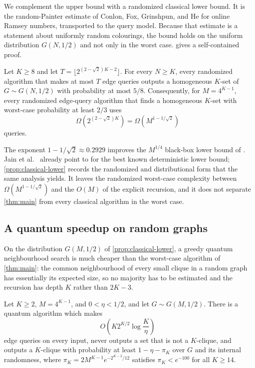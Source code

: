 We complement the upper bound with a randomized classical lower bound.  It
is the random-Painter estimate of Conlon, Fox, Grinshpun, and He
\cite[proof of Theorem~1]{ConlonFoxGrinshpunHe2019} for online Ramsey
numbers,
transported to the query model.  Because that estimate is a statement about
uniformly random colourings, the bound holds on the uniform distribution
$G(N,1/2)$ and not only in the worst case.  
gives a self-contained proof.

\begin{proposition}
\label{prop:classical-lower}
Let $K\ge8$ and let $T=\lfloor2^{(2-\sqrt2)K-2}\rfloor$.  For every
$N\ge K$, every randomized algorithm that makes at most $T$ edge queries
outputs a homogeneous $K$-set of $G\sim G(N,1/2)$ with probability at most
$5/8$.
Consequently, for $M=4^{K-1}$, every randomized edge-query algorithm that
finds a homogeneous $K$-set with worst-case probability at least $2/3$ uses
\[
 \Omega\!\left(2^{(2-\sqrt2)K}\right)
 =\Omega\!\left(M^{1-1/\sqrt2}\right)
\]
queries.
\end{proposition}

The exponent $1-1/\sqrt2\approx0.2929$ improves the $M^{1/4}$ black-box
lower bound of \cite{ImpagliazzoNaor1988,KomargodskiNaorYogev2019}.  Jain
et al.\ \cite[Section~III]{JainLiRobereXun2024} already point to
\cite{ConlonFoxGrinshpunHe2019} for the best known deterministic lower
bound; \cref{prop:classical-lower} records the randomized and
distributional form that the same analysis yields.  It leaves the
randomized worst-case complexity between $\Omega(M^{1-1/\sqrt2})$ and the
$O(M)$ of the explicit recursion, and it does not separate
\cref{thm:main} from every classical algorithm in the worst case.

\subsection{A quantum speedup on random graphs}
\label{sec:random-graphs}

On the distribution $G(M,1/2)$ of \cref{prop:classical-lower}, a greedy
quantum neighbourhood search is much cheaper than the worst-case algorithm
of \cref{thm:main}: the common neighbourhood of every small clique in a
random graph has essentially its expected size, so no majority has to be
estimated and the recursion has depth $K$ rather than $2K-3$.

\begin{proposition}
\label{prop:random-graph}
Let $K\ge2$, $M=4^{K-1}$, and $0<\eta<1/2$, and let $G\sim G(M,1/2)$.
There is a quantum algorithm which makes
\[
 O\!\left(K2^{K/2}\log\frac K\eta\right)
\]
edge queries on every input, never outputs a set that is not a $K$-clique,
and outputs a $K$-clique with probability at least $1-\eta-\pi_K$ over $G$
and its internal randomness, where $\pi_K=2M^{K-1}e^{-2^{K-2}/12}$
satisfies $\pi_K<e^{-100}$ for all $K\ge14$.
\end{proposition}

